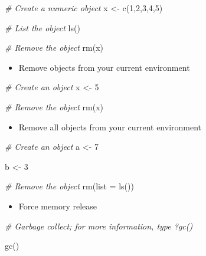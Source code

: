 \documentclass[
]{book}
\newenvironment{Shaded}{\begin{snugshade}}{\end{snugshade}}
\newcommand{\AttributeTok}[1]{\textcolor[rgb]{0.77,0.63,0.00}{#1}}
\newcommand{\CommentTok}[1]{\textcolor[rgb]{0.56,0.35,0.01}{\textit{#1}}}
\newcommand{\DecValTok}[1]{\textcolor[rgb]{0.00,0.00,0.81}{#1}}
\newcommand{\FunctionTok}[1]{\textcolor[rgb]{0.00,0.00,0.00}{#1}}
\newcommand{\NormalTok}[1]{#1}
\newcommand{\OtherTok}[1]{\textcolor[rgb]{0.56,0.35,0.01}{#1}}
\providecommand{\tightlist}{%
  \setlength{\itemsep}{0pt}\setlength{\parskip}{0pt}}
\begin{document}
\begin{Shaded}
\begin{Highlighting}[]
\CommentTok{\# Create a numeric object }
\NormalTok{x }\OtherTok{\textless{}{-}} \FunctionTok{c}\NormalTok{(}\DecValTok{1}\NormalTok{,}\DecValTok{2}\NormalTok{,}\DecValTok{3}\NormalTok{,}\DecValTok{4}\NormalTok{,}\DecValTok{5}\NormalTok{)}

\CommentTok{\# List the object }
\FunctionTok{ls}\NormalTok{()}

\CommentTok{\# Remove the object }
\FunctionTok{rm}\NormalTok{(x)}
\end{Highlighting}
\end{Shaded}

\begin{itemize}
\tightlist
\item
  Remove objects from your current environment
\end{itemize}

\begin{Shaded}
\begin{Highlighting}[]
\CommentTok{\# Create an object }
\NormalTok{x }\OtherTok{\textless{}{-}} \DecValTok{5}

\CommentTok{\# Remove the object }
\FunctionTok{rm}\NormalTok{(x)}
\end{Highlighting}
\end{Shaded}

\begin{itemize}
\tightlist
\item
  Remove all objects from your current environment
\end{itemize}

\begin{Shaded}
\begin{Highlighting}[]
\CommentTok{\# Create an object }
\NormalTok{a }\OtherTok{\textless{}{-}} \DecValTok{7}

\NormalTok{b }\OtherTok{\textless{}{-}} \DecValTok{3}

\CommentTok{\# Remove the object }
\FunctionTok{rm}\NormalTok{(}\AttributeTok{list =} \FunctionTok{ls}\NormalTok{())}
\end{Highlighting}
\end{Shaded}

\begin{itemize}
\tightlist
\item
  Force memory release
\end{itemize}

\begin{Shaded}
\begin{Highlighting}[]
\CommentTok{\# Garbage collect; for more information, type ?gc() }

\FunctionTok{gc}\NormalTok{()}
\end{Highlighting}
\end{Shaded}
\end{document}
